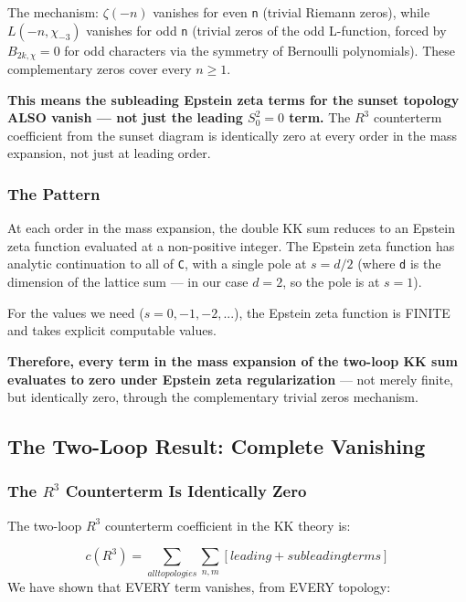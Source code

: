\documentclass[aps,prd,preprint,superscriptaddress,longbibliography,floatfix]{revtex4-2}
\theoremstyle{remark}
\begin{document}
The mechanism: $\zeta(-n)$ vanishes for even \texttt{n} (trivial Riemann zeros), while $L(-n, \chi_{-3})$ vanishes for odd \texttt{n} (trivial zeros of the odd L-function, forced by $B_{2k,\chi} = 0$ for odd characters via the symmetry of Bernoulli polynomials). These complementary zeros cover every $n \geq 1$.

\textbf{This means the subleading Epstein zeta terms for the sunset topology ALSO vanish --- not just the leading $S_{0}^{2} = 0$ term.} The $R^{3}$ counterterm coefficient from the sunset diagram is identically zero at every order in the mass expansion, not just at leading order.


\subsubsection{The Pattern}

At each order in the mass expansion, the double KK sum reduces to an Epstein zeta function evaluated at a non-positive integer. The Epstein zeta function has analytic continuation to all of \texttt{C}, with a single pole at $s = d/2$ (where \texttt{d} is the dimension of the lattice sum --- in our case $d = 2$, so the pole is at $s = 1$).

For the values we need ($s = 0, -1, -2, ...$), the Epstein zeta function is FINITE and takes explicit computable values.

\textbf{Therefore, every term in the mass expansion of the two-loop KK sum evaluates to zero under Epstein zeta regularization} --- not merely finite, but identically zero, through the complementary trivial zeros mechanism.



\subsection{The Two-Loop Result: Complete Vanishing}


\subsubsection{The $R^{3}$ Counterterm Is Identically Zero}

The two-loop $R^{3}$ counterterm coefficient in the KK theory is:


\begin{equation}
    c(R^{3}) = \sum_{all topologies} \sum_{n,m} [leading + subleading terms]
\end{equation}
We have shown that EVERY term vanishes, from EVERY topology:
\end{document}

